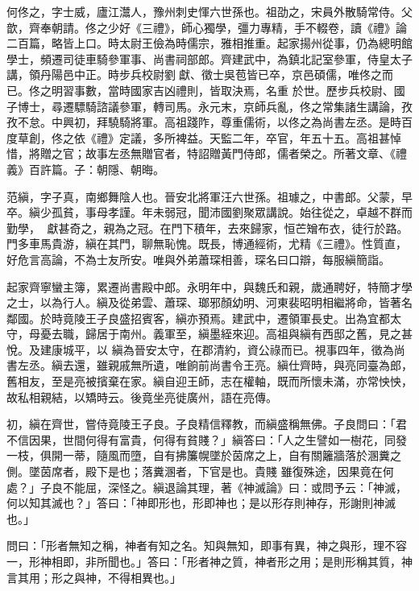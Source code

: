 \begin{pinyinscope}
 何佟之，字士威，廬江灊人，豫州刺史惲六世孫也。祖劭之，宋員外散騎常侍。父歆，齊奉朝請。佟之少好《三禮》，師心獨學，彊力專精，手不輟卷，讀《禮》論二百篇，略皆上口。時太尉王儉為時儒宗，雅相推重。起家揚州從事，仍為總明館學士，頻遷司徒車騎參軍事、尚書祠部郎。齊建武中，為鎮北記室參軍，侍皇太子講，領丹陽邑中正。時步兵校尉劉獻、徵士吳苞皆已卒，京邑碩儒，唯佟之而已。佟之明習事數，當時國家吉凶禮則，皆取決焉，名重
 於世。歷步兵校尉、國子博士，尋遷驃騎諮議參軍，轉司馬。永元末，京師兵亂，佟之常集諸生講論，孜孜不怠。中興初，拜驍騎將軍。高祖踐阼，尊重儒術，以佟之為尚書左丞。是時百度草創，佟之依《禮》定議，多所裨益。天監二年，卒官，年五十五。高祖甚悼惜，將贈之官；故事左丞無贈官者，特詔贈黃門侍郎，儒者榮之。所著文章、《禮義》百許篇。子：朝隱、朝晦。



 范縝，字子真，南鄉舞陰人也。晉安北將軍汪六世孫。祖璩之，中書郎。父蒙，早卒。縝少孤貧，事母孝謹。年未弱冠，聞沛國劉聚眾講說。始往從之，卓越不群而勤學，
 獻甚奇之，親為之冠。在門下積年，去來歸家，恒芒矰布衣，徒行於路。門多車馬貴游，縝在其門，聊無恥愧。既長，博通經術，尤精《三禮》。性質直，好危言高論，不為士友所安。唯與外弟蕭琛相善，琛名曰口辯，每服縝簡詣。



 起家齊寧蠻主簿，累遷尚書殿中郎。永明年中，與魏氏和親，歲通聘好，特簡才學之士，以為行人。縝及從弟雲、蕭琛、瑯邪顏幼明、河東裴昭明相繼將命，皆著名鄰國。於時竟陵王子良盛招賓客，縝亦預焉。建武中，遷領軍長史。出為宜都太守，母憂去職，歸居于南州。義軍至，縝墨絰來迎。高祖與縝有西邸之舊，見之甚悅。及建康城平，以
 縝為晉安太守，在郡清約，資公祿而已。視事四年，徵為尚書左丞。縝去還，雖親戚無所遺，唯餉前尚書令王亮。縝仕齊時，與亮同臺為郎，舊相友，至是亮被擯棄在家。縝自迎王師，志在權軸，既而所懷未滿，亦常怏怏，故私相親結，以矯時云。後竟坐亮徙廣州，語在亮傳。



 初，縝在齊世，嘗侍竟陵王子良。子良精信釋教，而縝盛稱無佛。子良問曰：「君不信因果，世間何得有富貴，何得有貧賤？」縝答曰：「人之生譬如一樹花，同發一枝，俱開一蒂，隨風而墮，自有拂簾幌墜於茵席之上，自有關籬牆落於溷糞之側。墜茵席者，殿下是也；落糞溷者，下官是也。貴賤
 雖復殊途，因果竟在何處？」子良不能屈，深怪之。縝退論其理，著《神滅論》曰：或問予云：「神滅，何以知其滅也？」答曰：「神即形也，形即神也；是以形存則神存，形謝則神滅也。」



 問曰：「形者無知之稱，神者有知之名。知與無知，即事有異，神之與形，理不容一，形神相即，非所聞也。」答曰：「形者神之質，神者形之用；是則形稱其質，神言其用；形之與神，不得相異也。」




\end{pinyinscope}
